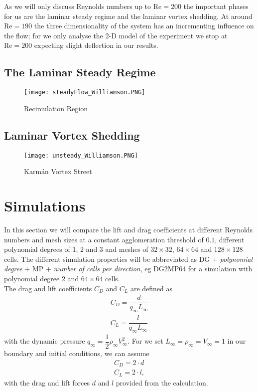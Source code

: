 	As we will only discuss Reynolds numbers up to $\text{Re} = 200$ the important phases for us are the laminar steady regime and the laminar vortex shedding. At around $\text{Re} = 190$ the three dimensionality of the system has an incrementing influence on the flow; for we only analyse the 2-D model of the experiment we stop at $\text{Re} = 200$ expecting slight deflection in our results.
	
	\subsection{The Laminar Steady Regime}
	
		\begin{figure}[htp]
			\centering
			\texttt{[image: steadyFlow\_Williamson.PNG]}
			\caption{Recirculation Region }
			\label{fig:steady}
		\end{figure}
	\subsection{Laminar Vortex Shedding}
	
		\begin{figure}[htp]
			\centering
			\texttt{[image: unsteady\_Williamson.PNG]}
			\caption{Karmán Vortex Street }
			\label{fig:unsteady}
		\end{figure}
		
\section{Simulations}
	In this section we will compare the lift and drag coefficients at different Reynolds numbers and mesh sizes at a constant agglomeration threshold of $0.1$, different polynomial degrees of 1, 2 and 3 and meshes of $32 \times 32$, $64 \times 64$ and $128 \times 128$ cells. The different simulation properties will be abbreviated as DG $+$ \textit{polynomial degree} $+$ MP $+$ \textit{number of cells per direction}, eg DG2MP64 for a simulation with polynomial degree 2 and $64 \times 64$ cells.\\
	 The drag and lift coefficients $C_D$ and $C_L$ are defined as
	\begin{align}
		C_D = \dfrac{d}{q_\infty L_\infty} \\
		C_L = \dfrac{l}{q_\infty L_\infty}
	\end{align}
	with the dynamic pressure $q_\infty = \dfrac{1}{2} \rho_\infty V_\infty^2$. For we set $L_\infty = \rho_\infty = V_\infty = 1$ in our boundary and initial conditions, we can assume
	\begin{align}
		C_D = 2 \cdot d \\
		C_L = 2 \cdot l,
	\end{align}
	with the drag and lift forces $d$ and $l$ provided from the calculation.
	
